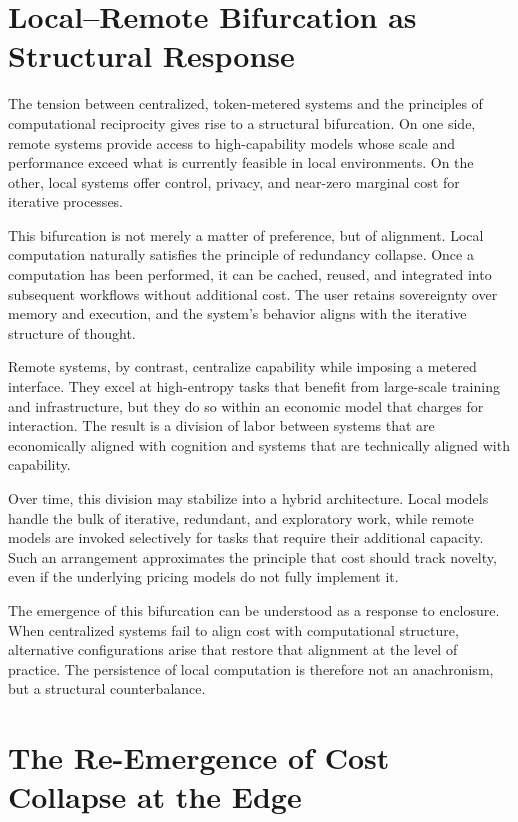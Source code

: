 \documentclass[12pt, oneside]{article}
\begin{document}
\section{Local--Remote Bifurcation as Structural Response}

The tension between centralized, token-metered systems and the principles of computational reciprocity gives rise to a structural bifurcation. On one side, remote systems provide access to high-capability models whose scale and performance exceed what is currently feasible in local environments. On the other, local systems offer control, privacy, and near-zero marginal cost for iterative processes.

This bifurcation is not merely a matter of preference, but of alignment. Local computation naturally satisfies the principle of redundancy collapse. Once a computation has been performed, it can be cached, reused, and integrated into subsequent workflows without additional cost. The user retains sovereignty over memory and execution, and the system’s behavior aligns with the iterative structure of thought.

Remote systems, by contrast, centralize capability while imposing a metered interface. They excel at high-entropy tasks that benefit from large-scale training and infrastructure, but they do so within an economic model that charges for interaction. The result is a division of labor between systems that are economically aligned with cognition and systems that are technically aligned with capability.

Over time, this division may stabilize into a hybrid architecture. Local models handle the bulk of iterative, redundant, and exploratory work, while remote models are invoked selectively for tasks that require their additional capacity. Such an arrangement approximates the principle that cost should track novelty, even if the underlying pricing models do not fully implement it.

The emergence of this bifurcation can be understood as a response to enclosure. When centralized systems fail to align cost with computational structure, alternative configurations arise that restore that alignment at the level of practice. The persistence of local computation is therefore not an anachronism, but a structural counterbalance.

\section{The Re-Emergence of Cost Collapse at the Edge}
\end{document}
